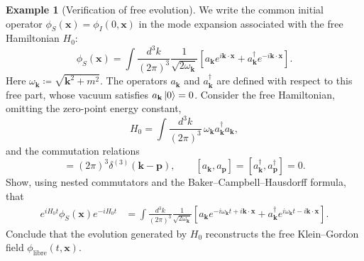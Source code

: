 \documentclass[11pt,letterpaper]{article}
\theoremstyle{definition}
\theoremstyle{definition}
\newtheorem{ejemplo}{Example}
\begin{document}
\begin{ejemplo}[Verification of free evolution]
We write the common initial operator $\phi_S(\mathbf{x})=\phi_I(0,\mathbf{x})$
in the mode expansion associated with the free Hamiltonian $H_0$:
\begin{equation}
  \phi_S(\mathbf{x})=
  \int\frac{d^3k}{(2\pi)^3}\frac{1}{\sqrt{2\omega_{\mathbf{k}}}}
  \left[
    a_{\mathbf{k}}e^{i\mathbf{k}\cdot\mathbf{x}}
    +a_{\mathbf{k}}^\dagger e^{-i\mathbf{k}\cdot\mathbf{x}}
  \right].
  \label{eq:freefield0}
\end{equation}
Here $\omega_{\mathbf{k}}\coloneqq\sqrt{\mathbf{k}^2+m^2}$.
The operators $a_{\mathbf{k}}$ and $a_{\mathbf{k}}^\dagger$ are defined
with respect to this free part, whose vacuum satisfies $a_{\mathbf{k}}\ket{0}=0$.
Consider the free Hamiltonian, omitting the zero-point energy constant,
\begin{equation}
  H_0=\int\frac{d^3k}{(2\pi)^3}\,
  \omega_{\mathbf{k}}a_{\mathbf{k}}^\dagger a_{\mathbf{k}},
\end{equation}
and the commutation relations
\begin{equation}
  [a_{\mathbf{k}},a_{\mathbf{p}}^\dagger]
  =(2\pi)^3\delta^{(3)}(\mathbf{k}-\mathbf{p}),
  \qquad
  [a_{\mathbf{k}},a_{\mathbf{p}}]
  =[a_{\mathbf{k}}^\dagger,a_{\mathbf{p}}^\dagger]=0.
\end{equation}
Show, using nested commutators and the Baker--Campbell--Hausdorff
formula, that
\begin{equation}
  \boxed{\begin{aligned}
  e^{iH_0t}\phi_S(\mathbf{x})e^{-iH_0t}
  &={}\int\frac{d^3k}{(2\pi)^3}\frac{1}{\sqrt{2\omega_{\mathbf{k}}}}
  \left[
    a_{\mathbf{k}}e^{-i\omega_{\mathbf{k}}t+i\mathbf{k}\cdot\mathbf{x}}
    +a_{\mathbf{k}}^\dagger e^{i\omega_{\mathbf{k}}t-i\mathbf{k}\cdot\mathbf{x}}
  \right].
  \end{aligned}}
  \label{eq:freefield}
\end{equation}
Conclude that the evolution generated by $H_0$ reconstructs the free
Klein--Gordon field $\phi_{\mathrm{libre}}(t,\mathbf{x})$.


\end{ejemplo}
\end{document}
